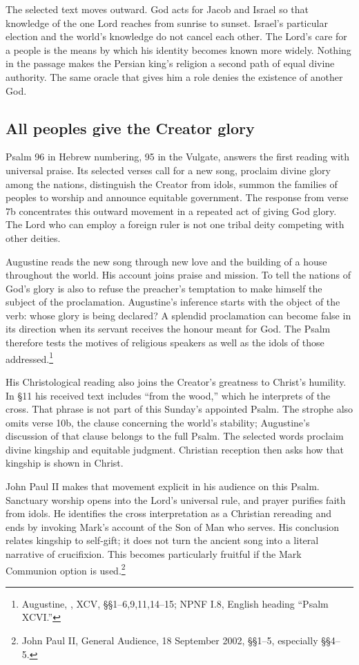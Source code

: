 The selected text moves outward. God acts for Jacob and Israel so that knowledge of the one Lord reaches from sunrise to sunset. Israel's particular election and the world's knowledge do not cancel each other. The Lord's care for a people is the means by which his identity becomes known more widely. Nothing in the passage makes the Persian king's religion a second path of equal divine authority. The same oracle that gives him a role denies the existence of another God.

\subsection{All peoples give the Creator glory}
Psalm 96 in Hebrew numbering, 95 in the Vulgate, answers the first reading with universal praise. Its selected verses call for a new song, proclaim divine glory among the nations, distinguish the Creator from idols, summon the families of peoples to worship and announce equitable government. The response from verse 7b concentrates this outward movement in a repeated act of giving God glory. The Lord who can employ a foreign ruler is not one tribal deity competing with other deities.

Augustine reads the new song through new love and the building of a house throughout the world. His account joins praise and mission. To tell the nations of God's glory is also to refuse the preacher's temptation to make himself the subject of the proclamation. Augustine's inference starts with the object of the verb: whose glory is being declared? A splendid proclamation can become false in its direction when its servant receives the honour meant for God. The Psalm therefore tests the motives of religious speakers as well as the idols of those addressed.\footnote{Augustine, , XCV, §§1--6,9,11,14--15; NPNF I.8, English heading ``Psalm XCVI.''}

His Christological reading also joins the Creator's greatness to Christ's humility. In §11 his received text includes ``from the wood,'' which he interprets of the cross. That phrase is not part of this Sunday's appointed Psalm. The strophe also omits verse 10b, the clause concerning the world's stability; Augustine's discussion of that clause belongs to the full Psalm. The selected words proclaim divine kingship and equitable judgment. Christian reception then asks how that kingship is shown in Christ.

John Paul II makes that movement explicit in his audience on this Psalm. Sanctuary worship opens into the Lord's universal rule, and prayer purifies faith from idols. He identifies the cross interpretation as a Christian rereading and ends by invoking Mark's account of the Son of Man who serves. His conclusion relates kingship to self-gift; it does not turn the ancient song into a literal narrative of crucifixion. This becomes particularly fruitful if the Mark Communion option is used.\footnote{John Paul II, General Audience, 18 September 2002, §§1--5, especially §§4--5.}

